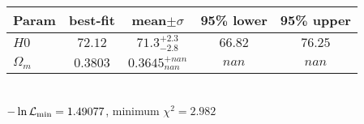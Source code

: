 \begin{tabular}{|l|c|c|c|c|} 
 \hline 
Param & best-fit & mean$\pm\sigma$ & 95\% lower & 95\% upper \\ \hline 
$H0$ &$72.12$ & $71.3_{-2.8}^{+2.3}$ & $66.82$ & $76.25$ \\ 
$\Omega_{m }$ &$0.3803$ & $0.3645_{nan}^{+nan}$ & $nan$ & $nan$ \\ 
\hline 
 \end{tabular} \\ 
$-\ln{\cal L}_\mathrm{min} =1.49077$, minimum $\chi^2=2.982$ \\ 
